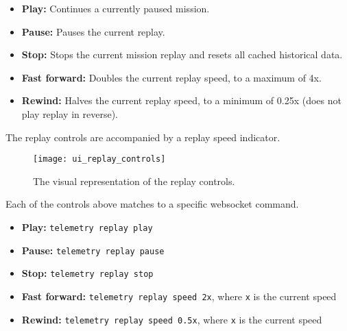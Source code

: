 \begin{itemize}
    \item \textbf{Play:} Continues a currently paused mission.
    \item \textbf{Pause:} Pauses the current replay.
    \item \textbf{Stop:} Stops the current mission replay and resets all cached historical data.
    \item \textbf{Fast forward:} Doubles the current replay speed, to a maximum of 4x.
    \item \textbf{Rewind:} Halves the current replay speed, to a minimum of 0.25x (does not play replay in reverse).
\end{itemize}

The replay controls are accompanied by a replay speed indicator.

\begin{figure}[ht]
\centering
\texttt{[image: ui\_replay\_controls]}
\caption{The visual representation of the replay controls.}
\label{fig:Replay Controls}
\end{figure}

Each of the controls above matches to a specific websocket command.

\begin{itemize}
    \item \textbf{Play:} \verb|telemetry replay play|
    \item \textbf{Pause:} \verb|telemetry replay pause|
    \item \textbf{Stop:} \verb|telemetry replay stop|
    \item \textbf{Fast forward:} \verb|telemetry replay speed 2x|, where \verb|x| is the current speed
    \item \textbf{Rewind:} \verb|telemetry replay speed 0.5x|, where \verb|x| is the current speed
\end{itemize}
